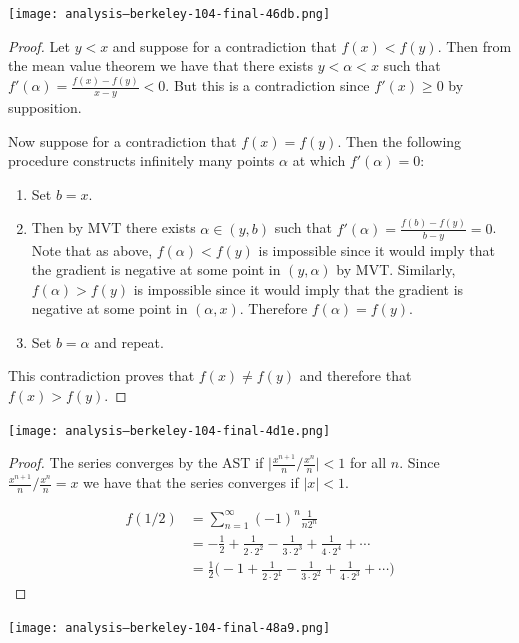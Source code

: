 \texttt{[image: analysis--berkeley-104-final-46db.png]}
\begin{proof}
  Let $y < x$ and suppose for a contradiction that $f(x) < f(y)$. Then from the mean value theorem we have that
  there exists $y < \alpha < x$ such that $f'(\alpha) = \frac{f(x) - f(y)}{x - y} < 0$. But this is a
  contradiction since $f'(x) \geq 0$ by supposition.

  Now suppose for a contradiction that $f(x) = f(y)$. Then the following procedure constructs infinitely many
  points $\alpha$ at which $f'(\alpha) = 0$:

  \begin{enumerate}
  \item Set $b = x$.
  \item Then by MVT there exists $\alpha \in (y, b)$ such that $f'(\alpha) = \frac{f(b) - f(y)}{b - y} = 0$. Note
    that as above, $f(\alpha) < f(y)$ is impossible since it would imply that the gradient is negative at some
    point in $(y, \alpha)$ by MVT. Similarly, $f(\alpha) > f(y)$ is impossible since it would imply that the
    gradient is negative at some point in $(\alpha, x)$. Therefore $f(\alpha) = f(y)$.
  \item Set $b = \alpha$ and repeat.
  \end{enumerate}

  This contradiction proves that $f(x) \ne f(y)$ and therefore that $f(x) > f(y)$.
\end{proof}

\texttt{[image: analysis--berkeley-104-final-4d1e.png]}
\begin{proof}
  The series converges by the AST if $\Big|\frac{x^{n+1}}{n} / \frac{x^n}{n}\Big| < 1$ for all $n$.
  Since $\frac{x^{n+1}}{n} / \frac{x^n}{n} = x $ we have that the series converges if $|x| < 1$.

  \begin{align*}
    f(1/2)
    &= \sum_{n=1}^\infty (-1)^n \frac{1}{n2^n} \\
    &= -\frac{1}{2} + \frac{1}{2 \cdot 2^2} - \frac{1}{3 \cdot 2^3} + \frac{1}{4 \cdot 2^4} + \cdots \\
    &= \frac{1}{2}\Bigg( -1 + \frac{1}{2 \cdot 2^1} - \frac{1}{3 \cdot 2^2} + \frac{1}{4 \cdot 2^3} + \cdots \Bigg)
  \end{align*}



\end{proof}


\texttt{[image: analysis--berkeley-104-final-48a9.png]}




